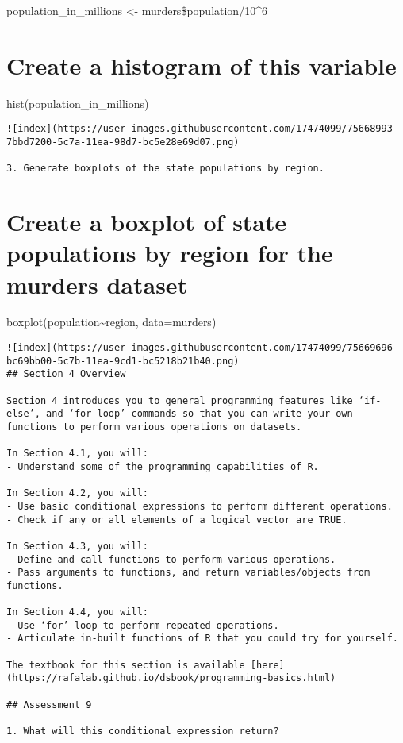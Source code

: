 \documentclass[
]{article}
\begin{document}
population\_in\_millions \textless- murders\$population/10\^{}6

\hypertarget{create-a-histogram-of-this-variable}{%
\section{Create a histogram of this
variable}\label{create-a-histogram-of-this-variable}}

hist(population\_in\_millions)

\begin{verbatim}
![index](https://user-images.githubusercontent.com/17474099/75668993-7bbd7200-5c7a-11ea-98d7-bc5e28e69d07.png)

3. Generate boxplots of the state populations by region.
\end{verbatim}

\hypertarget{create-a-boxplot-of-state-populations-by-region-for-the-murders-dataset}{%
\section{Create a boxplot of state populations by region for the murders
dataset}\label{create-a-boxplot-of-state-populations-by-region-for-the-murders-dataset}}

boxplot(population\textasciitilde region, data=murders)

\begin{verbatim}
![index](https://user-images.githubusercontent.com/17474099/75669696-bc69bb00-5c7b-11ea-9cd1-bc5218b21b40.png)
## Section 4 Overview

Section 4 introduces you to general programming features like ‘if-else’, and ‘for loop’ commands so that you can write your own functions to perform various operations on datasets.

In Section 4.1, you will:
- Understand some of the programming capabilities of R.

In Section 4.2, you will:
- Use basic conditional expressions to perform different operations.
- Check if any or all elements of a logical vector are TRUE.

In Section 4.3, you will:
- Define and call functions to perform various operations.
- Pass arguments to functions, and return variables/objects from functions.

In Section 4.4, you will:
- Use ‘for’ loop to perform repeated operations.
- Articulate in-built functions of R that you could try for yourself.

The textbook for this section is available [here](https://rafalab.github.io/dsbook/programming-basics.html)

## Assessment 9

1. What will this conditional expression return?
\end{verbatim}
\end{document}
